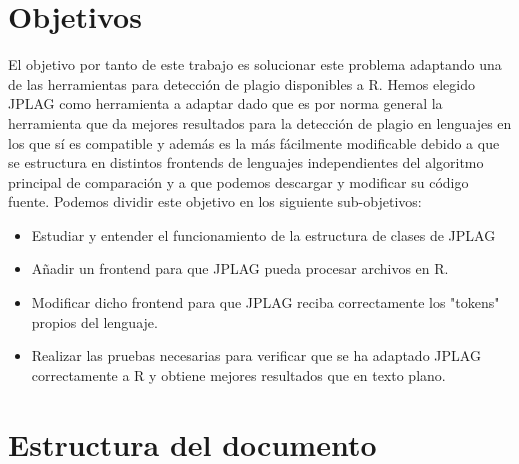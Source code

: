 \section{Objetivos}

El objetivo por tanto de este trabajo es solucionar este problema adaptando una de las herramientas para detección de plagio disponibles a R.
\newline
Hemos elegido JPLAG como herramienta a adaptar dado que es por norma general la herramienta que da mejores resultados para la detección de plagio en lenguajes en los que sí es compatible y además es la más fácilmente modificable debido a que se estructura en distintos frontends de lenguajes independientes del algoritmo principal de comparación y a que podemos descargar y modificar su código fuente.
\newline
Podemos dividir este objetivo en los siguiente sub-objetivos:
\begin{itemize}
	\item Estudiar y entender el funcionamiento de la estructura de clases de JPLAG
	\item Añadir un frontend para que JPLAG pueda procesar archivos en R.
	\item Modificar dicho frontend para que JPLAG reciba correctamente los "tokens" propios del lenguaje.
	\item Realizar las pruebas necesarias para verificar que se ha adaptado JPLAG correctamente a R y obtiene mejores resultados que en texto plano.
\end{itemize}
	




\section{Estructura del documento}


